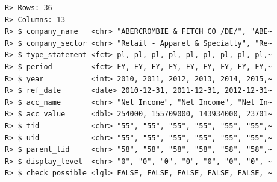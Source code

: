 \documentclass[
  12pt,
]{book}
\newenvironment{Shaded}{\begin{snugshade}}{\end{snugshade}}
\newcommand{\AttributeTok}[1]{\textcolor[rgb]{0.61,0.61,0.61}{#1}}
\newcommand{\CommentTok}[1]{\textcolor[rgb]{0.37,0.37,0.37}{\textit{#1}}}
\newcommand{\DecValTok}[1]{\textcolor[rgb]{0.06,0.06,0.06}{#1}}
\newcommand{\FunctionTok}[1]{\textcolor[rgb]{0,0,0}{#1}}
\newcommand{\NormalTok}[1]{#1}
\newcommand{\OtherTok}[1]{\textcolor[rgb]{0.37,0.37,0.37}{#1}}
\newcommand{\SpecialCharTok}[1]{\textcolor[rgb]{0,0,0}{#1}}
\newcommand{\StringTok}[1]{\textcolor[rgb]{0.5,0.5,0.5}{#1}}
\begin{document}
\begin{Shaded}
\end{Shaded}

\begin{verbatim}
R> Rows: 36
R> Columns: 13
R> $ company_name   <chr> "ABERCROMBIE & FITCH CO /DE/", "ABE~
R> $ company_sector <chr> "Retail - Apparel & Specialty", "Re~
R> $ type_statement <fct> pl, pl, pl, pl, pl, pl, pl, pl, pl,~
R> $ period         <fct> FY, FY, FY, FY, FY, FY, FY, FY, FY,~
R> $ year           <int> 2010, 2011, 2012, 2013, 2014, 2015,~
R> $ ref_date       <date> 2010-12-31, 2011-12-31, 2012-12-31~
R> $ acc_name       <chr> "Net Income", "Net Income", "Net In~
R> $ acc_value      <dbl> 254000, 155709000, 143934000, 23701~
R> $ tid            <chr> "55", "55", "55", "55", "55", "55",~
R> $ uid            <chr> "55", "55", "55", "55", "55", "55",~
R> $ parent_tid     <chr> "58", "58", "58", "58", "58", "58",~
R> $ display_level  <chr> "0", "0", "0", "0", "0", "0", "0", ~
R> $ check_possible <lgl> FALSE, FALSE, FALSE, FALSE, FALSE, ~
\end{verbatim}
\end{document}
